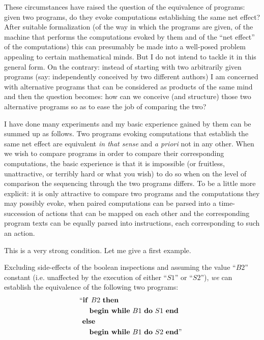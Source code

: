\documentclass[twoside,11pt]{book}
\begin{document}
These circumstances have raised the question of the equivalence of programs: given two programs, do they evoke computations establishing the same net effect? After suitable formalization (of the way in which the programs are given, of the machine that performs the computations evoked by them and of the ``net effect'' of the computations) this can presumably be made into a well-posed problem appealing to certain mathematical minds. But I do not intend to tackle it in this general form. On the contrary: instead of starting with two arbitrarily given programs (say: independently conceived by two different authors) I am concerned with alternative programs that can be considered as products of the same mind and then the question becomes: how can we conceive (and structure) those two alternative programs so as to ease the job of comparing the two?

I have done many experiments and my basic experience gained by them can be summed up as follows. Two programs evoking computations that establish the same net effect are equivalent \textit{in that sense} and \textit{a priori} not in any other. When we wish to compare programs in order to compare their corresponding computations, the basic experience is that it is impossible (or fruitless, unattractive, or terribly hard or what you wish) to do so when on the level of comparison the sequencing through the two programs differs. To be a little more explicit: it is only attractive to compare two programs and the computations they may possibly evoke, when paired computations can be parsed into a time-succession of actions that can be mapped on each other and the corresponding program texts can be equally parsed into instructions, each corresponding to such an action.

This is a very strong condition. Let me give a first example.

Excluding side-effects of the boolean inspections and assuming the value ``$B2$'' constant (i.e. unaffected by the execution of either ``$S1$'' or ``$S2$''), \textit{we} can establish the equivalence of the following two programs:
\begin{equation}
	\label{eq:comparing-example-1}
	\begin{split}
	&\text{\hspace{-.4em}``\textbf{if }} B2\text{ \textbf{then}}\\
	&\quad \text{\textbf{begin while} } B1\text{ \textbf{do} } S1 \text{ \textbf{end}}\\
	&\text{\textbf{else}}\\
	&\quad \text{\textbf{begin while} } B1\text{ \textbf{do} } S2\text{ \textbf{end}''}
	\end{split}
\end{equation}
\end{document}
